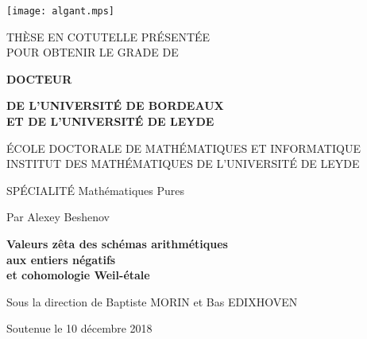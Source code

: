 \thispagestyle{empty}

\begin{center}
  \noindent{}\hspace{0.9cm}
  \hspace{0.9cm}
  \texttt{[image: algant.mps]}
\end{center}

\begingroup
\normalfont\sffamily
\begin{center}
  \noindent THÈSE EN COTUTELLE PRÉSENTÉE \\
  POUR OBTENIR LE GRADE DE

  \vspace{0.5em}

  \noindent \textbf{DOCTEUR}

  \vspace{0.5em}

  \noindent \textbf{DE L’UNIVERSITÉ DE BORDEAUX} \\
  \textbf{ET DE L’UNIVERSITÉ DE LEYDE}

  \vspace{0.5em}

  \noindent ÉCOLE DOCTORALE DE MATHÉMATIQUES ET INFORMATIQUE \\
  INSTITUT DES MATHÉMATIQUES DE L’UNIVERSITÉ DE LEYDE

  \vspace{0.5em}

  \noindent SPÉCIALITÉ Mathématiques Pures

  \vspace{0.5em}

  \noindent Par Alexey Beshenov

  \vspace{0.75em}

  {\large\noindent\textbf{Valeurs zêta des schémas arithmétiques\\
      aux entiers négatifs\\
      et cohomologie Weil-étale}

  }

  \vspace{0.75em}

  \noindent Sous la direction de Baptiste MORIN et Bas EDIXHOVEN

  \vspace{0.75em}

  \noindent Soutenue le 10 décembre 2018
\end{center}

